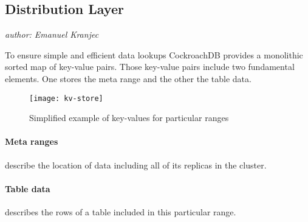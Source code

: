 \subsection{Distribution Layer}
\emph{author: Emanuel Kranjec}\bigskip

To ensure simple and efficient data lookups CockroachDB provides a monolithic sorted map of key-value pairs. Those key-value
pairs include two fundamental elements. One stores the meta range and the other the table data.

\begin{figure}[H]
    \texttt{[image: kv-store]}
    \caption{Simplified example of key-values for particular ranges}
    \label{fig:kv-store}
\end{figure}

\paragraph{Meta ranges}
describe the location of data including all of its replicas in the cluster.

\paragraph{Table data}
describes the rows of a table included in this particular range.

